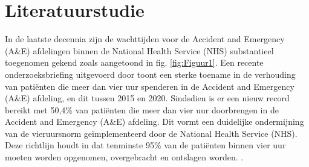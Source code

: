 
\section{Literatuurstudie}%
\label{sec:literatuurstudie}









In de laatste decennia zijn de wachttijden voor de Accident and Emergency (A\&E) afdelingen binnen de National Health Service (NHS) substantieel toegenomen gekend zoals aangetoond in fig. \ref{fig:Figuur1}. Een recente onderzoeksbriefing uitgevoerd door \autocite{Baker2024} toont een sterke toename in de verhouding van patiënten die meer dan vier uur spenderen in de Accident and Emergency (A\&E) afdeling, en dit tussen 2015 en 2020. Sindsdien is er een nieuw record bereikt met 50,4\% van patiënten die meer dan vier uur doorbrengen in de Accident and Emergency (A\&E) afdeling. Dit vormt een duidelijke ondermijning van de vieruursnorm geïmplementeerd door de National Health Service (NHS). Deze richtlijn houdt in dat tenminste 95\% van de patiënten binnen vier uur moeten worden opgenomen, overgebracht en ontslagen worden. \autocite{NationalStatisticsONS2024}.

